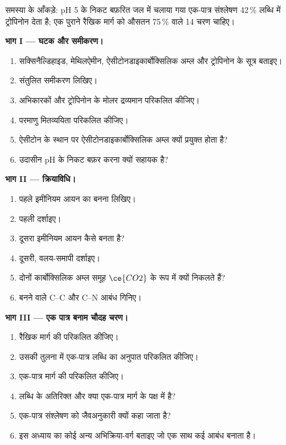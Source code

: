\begin{problem}
\label{pb:b3:total-synthesis:1}
समस्या के आँकड़े: pH 5 के निकट बफ़रित जल में चलाया गया एक-पात्र संश्लेषण
42\,\% लब्धि में ट्रोपिनोन देता है; एक पुराने रैखिक मार्ग को औसतन 75\,\% वाले 14 चरण चाहिए।

\medskip\noindent\textbf{भाग I --- घटक और समीकरण।}
\begin{enumerate}
  \item सक्सिनैल्डिहाइड, मेथिलऐमीन, ऐसीटोनडाइकार्बोक्सिलिक अम्ल
        और ट्रोपिनोन के सूत्र बताइए।
  \item संतुलित समीकरण लिखिए।
  \item अभिकारकों और ट्रोपिनोन के मोलर द्रव्यमान परिकलित कीजिए।
  \item परमाणु मितव्ययिता परिकलित कीजिए।
  \item ऐसीटोन के स्थान पर ऐसीटोनडाइकार्बोक्सिलिक अम्ल क्यों प्रयुक्त होता है?
  \item उदासीन pH के निकट बफ़र करना क्यों सहायक है?
\end{enumerate}

\medskip\noindent\textbf{भाग II --- क्रियाविधि।}
\begin{enumerate}[resume]
  \item पहले इमीनियम आयन का बनना लिखिए।
  \item पहली  दर्शाइए।
  \item दूसरा इमीनियम आयन कैसे बनता है?
  \item दूसरी, वलय-समापी  दर्शाइए।
  \item दोनों कार्बोक्सिलिक अम्ल समूह $\ce{CO2}$ के रूप में क्यों निकलते हैं?
  \item बनने वाले C--C और C--N आबंध गिनिए।
\end{enumerate}

\medskip\noindent\textbf{भाग III --- एक पात्र बनाम चौदह चरण।}
\begin{enumerate}[resume]
  \item रैखिक मार्ग की  परिकलित कीजिए।
  \item उसकी तुलना में एक-पात्र लब्धि का अनुपात परिकलित कीजिए।
  \item एक-पात्र मार्ग की  परिकलित कीजिए।
  \item लब्धि के अतिरिक्त और क्या एक-पात्र मार्ग के पक्ष में है?
  \item एक-पात्र संश्लेषण को जैवअनुकारी क्यों कहा जाता है?
  \item इस अध्याय का कोई अन्य अभिक्रिया-वर्ग बताइए जो एक साथ कई आबंध बनाता है।
\end{enumerate}


\end{problem}
